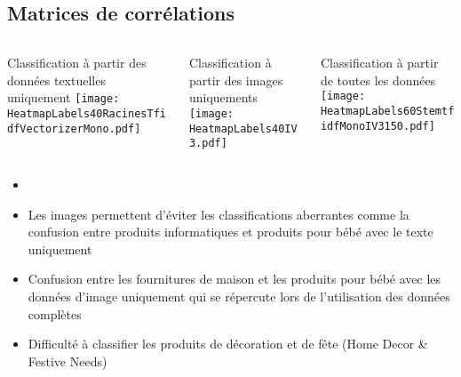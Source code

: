\documentclass[8pt,aspectratio=169,hyperref={unicode=true}]{beamer}
\begin{document}
\subsection{Matrices de corrélations}
\begin{frame}{\insertsection}{\insertsubsection}
    \begin{columns}
        \begin{column}{.33\textwidth}
            Classification à partir des données textuelles uniquement
            \texttt{[image: HeatmapLabels40RacinesTfidfVectorizerMono.pdf]}
        \end{column}
        \begin{column}{.33\textwidth}
            Classification à partir des images uniquements
            \texttt{[image: HeatmapLabels40IV3.pdf]}
        \end{column}
        \begin{column}{.33\textwidth}
            Classification à partir de toutes les données
            \texttt{[image: HeatmapLabels60StemtfidfMonoIV3150.pdf]}
        \end{column}
    \end{columns}
    \begin{itemize}
        \item[]
        \item Les images permettent d'éviter les classifications aberrantes comme la confusion entre produits informatiques et produits pour bébé avec le texte uniquement
        \item Confusion entre les fournitures de maison et les produits pour bébé avec les données d'image uniquement qui se répercute lors de l'utilisation des données complètes
        \item Difficulté à classifier les produits de décoration et de fête (Home Decor \& Festive Needs)
    \end{itemize}
\end{frame}
\end{document}
